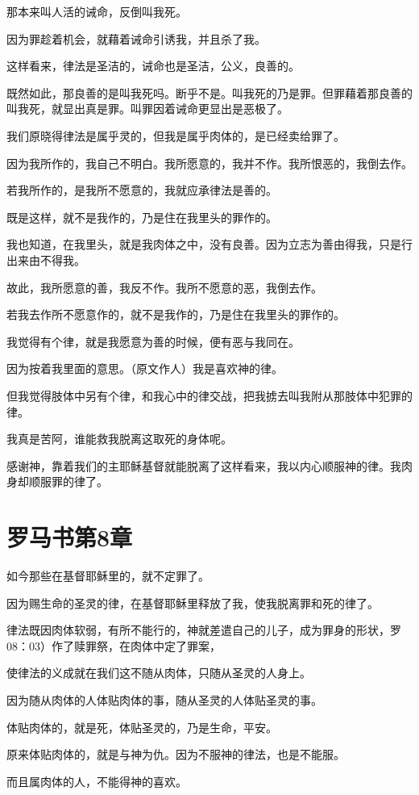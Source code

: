 \documentclass[12pt,oneside]{book}
\begin{document}
那本来叫人活的诫命，反倒叫我死。

因为罪趁着机会，就藉着诫命引诱我，并且杀了我。

这样看来，律法是圣洁的，诫命也是圣洁，公义，良善的。

既然如此，那良善的是叫我死吗。断乎不是。叫我死的乃是罪。但罪藉着那良善的叫我死，就显出真是罪。叫罪因着诫命更显出是恶极了。

我们原晓得律法是属乎灵的，但我是属乎肉体的，是已经卖给罪了。

因为我所作的，我自己不明白。我所愿意的，我并不作。我所恨恶的，我倒去作。

若我所作的，是我所不愿意的，我就应承律法是善的。

既是这样，就不是我作的，乃是住在我里头的罪作的。

我也知道，在我里头，就是我肉体之中，没有良善。因为立志为善由得我，只是行出来由不得我。

故此，我所愿意的善，我反不作。我所不愿意的恶，我倒去作。

若我去作所不愿意作的，就不是我作的，乃是住在我里头的罪作的。

我觉得有个律，就是我愿意为善的时候，便有恶与我同在。

因为按着我里面的意思。（原文作人）我是喜欢神的律。

但我觉得肢体中另有个律，和我心中的律交战，把我掳去叫我附从那肢体中犯罪的律。

我真是苦阿，谁能救我脱离这取死的身体呢。

感谢神，靠着我们的主耶稣基督就能脱离了这样看来，我以内心顺服神的律。我肉身却顺服罪的律了。

\chapter{罗马书第8章}
如今那些在基督耶稣里的，就不定罪了。

因为赐生命的圣灵的律，在基督耶稣里释放了我，使我脱离罪和死的律了。

律法既因肉体软弱，有所不能行的，神就差遣自己的儿子，成为罪身的形状，罗08：03）作了赎罪祭，在肉体中定了罪案，

使律法的义成就在我们这不随从肉体，只随从圣灵的人身上。

因为随从肉体的人体贴肉体的事，随从圣灵的人体贴圣灵的事。

体贴肉体的，就是死，体贴圣灵的，乃是生命，平安。

原来体贴肉体的，就是与神为仇。因为不服神的律法，也是不能服。

而且属肉体的人，不能得神的喜欢。
\end{document}
